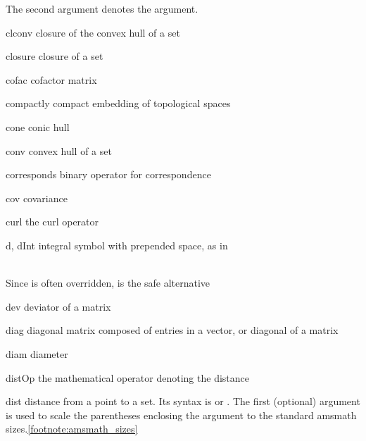 \documentclass[english,a4paper,DIV=12,parskip=full,oneside]{scrartcl}
\begin{document}
\begin{commandlist}
            The second argument denotes the argument.
            \par{}
            \par{}
        \item[clconv] closure of the convex hull of a set 
        \item[closure] closure of a set 
        \item[cofac] cofactor matrix 
        \item[compactly] compact embedding of topological spaces \mathCodeExample{\compactly}
        \item[cone] conic hull \mathCodeExample{\cone}
        \item[conv] convex hull of a set 
        \item[corresponds] binary operator for correspondence 
        \item[cov] covariance \mathCodeExample{\cov}
        \item[curl] the curl operator \mathCodeExample{\curl}
        \item[d, dInt] integral symbol with prepended space, as in
            \par{}
            \\Since \codeCommand{\d} is often overridden, \codeCommand{\dInt} is the safe alternative
        \item[dev] deviator of a matrix 
        \item[diag] diagonal matrix composed of entries in a vector, or diagonal of a matrix
            \par{}
            \par{}
        \item[diam] diameter 
        \item[distOp] the mathematical operator denoting the distance
            \par\mathCodeExample{\distOp}
        \item[dist] distance from a point to a set.
            Its syntax is  or .
            The first (optional) argument is used to scale the parentheses enclosing the argument to the standard amsmath sizes.\cref{footnote:amsmath_sizes}

\end{commandlist}
\end{document}
